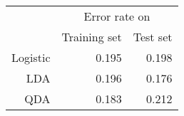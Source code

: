 \begin{tabular}{r|r|r|}

& \multicolumn{2}{c|}{Error rate on} \\
         & Training set & Test set    \\
\hline
Logistic & 0.195        & 0.198       \\
LDA      & 0.196        & 0.176       \\
QDA      & 0.183        & 0.212       \\

\end{tabular}